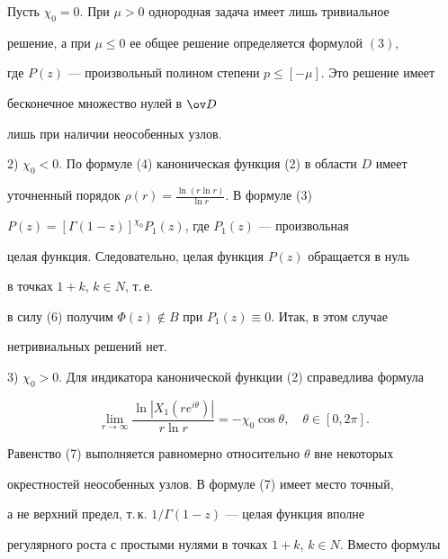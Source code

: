  


 


\begin{thm} 


Пусть $\chi_0=0$. При $\mu>0$ однородная задача имеет лишь тривиальное 


решение, а при $\mu\le0$ ее общее решение определяется формулой $(3)$, 


где $P(z)$ --- произвольный полином степени $p\le[-\mu]$. Это решение имеет 


бесконечное множество нулей в $\ov D$ 


лишь при наличии неособенных узлов. 


\end{thm} 


 


 


2) $\chi_0<0$. По формуле (4) каноническая функция (2) в области $D$ имеет 


уточненный порядок $\rho(r)=\frac{\ln(r\ln r)}{\ln r}$. В формуле (3) 


$P(z)=[\Gamma(1-z)]^{\chi_0}P_1(z)$, где $P_1(z)$ --- произвольная 


целая функция. Следовательно, целая функция $P(z)$ обращается в нуль 


в точках $1+k$, $k\in N$, т.\,е. 


в силу (6) получим $\Phi(z)\notin B$ при $P_1(z)\equiv0$. Итак, в этом случае 


нетривиальных решений нет. 


 


3) $\chi_0>0$. Для индикатора канонической функции (2) справедлива формула 


\begin{equation} 


\lim_{r\to\infty}\frac{\ln|X_1(re^{i\theta})|}{r\ln r}= 


-\chi_0\cos\theta,\quad \theta\in[0,2\pi]. 


\end{equation} 


Равенство (7) выполняется равномерно относительно $\theta$ вне некоторых 


окрестностей неособенных узлов. В формуле (7) имеет место точный, 


а не верхний предел, т.\,к. $1/\Gamma(1-z)$ --- целая функция вполне 


регулярного роста с простыми нулями в точках $1+k$, $k\in N$. Вместо формулы 


